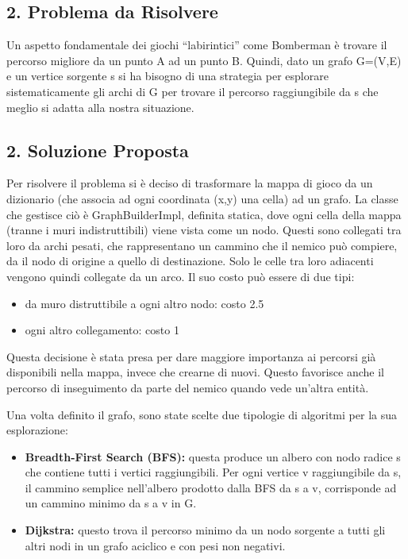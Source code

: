\documentclass[a4paper,12pt]{report}
\begin{document}
\subsection*{2. Problema da Risolvere}
\par
Un aspetto fondamentale dei giochi “labirintici” come Bomberman è trovare il percorso migliore da un punto A ad un punto B. Quindi, dato un grafo G=(V,E) e un vertice sorgente s si ha bisogno di una strategia per esplorare sistematicamente gli archi di G per trovare il percorso raggiungibile da s che meglio si adatta alla nostra situazione. 

\subsection*{2. Soluzione Proposta}
\par
Per risolvere il problema si è deciso di trasformare la mappa di gioco da un dizionario (che associa ad ogni coordinata (x,y) una cella) ad un grafo.
La classe che gestisce ciò è GraphBuilderImpl, definita statica, dove ogni cella della mappa (tranne i muri indistruttibili) viene vista come un nodo. Questi sono collegati tra loro da archi pesati, che rappresentano un cammino che il nemico può compiere, da il nodo di origine a quello di destinazione. Solo le celle tra loro adiacenti vengono quindi collegate da un arco. Il suo costo può essere di due tipi:
\begin{itemize}
    \item da muro distruttibile a ogni altro nodo: costo 2.5
    \item ogni altro collegamento: costo 1
\end{itemize}
Questa decisione è stata presa per dare maggiore importanza ai percorsi già disponibili nella mappa, invece che crearne di nuovi. Questo favorisce anche il percorso di inseguimento da parte del nemico quando vede un'altra entità.

\par
Una volta definito il grafo, sono state scelte due tipologie di algoritmi per la sua esplorazione:
\begin{itemize}
    \item \textbf{Breadth-First Search (BFS):} questa produce un albero con nodo radice s che contiene tutti i vertici raggiungibili. Per ogni vertice v raggiungibile da s, il cammino semplice nell’albero prodotto dalla BFS da s a v, corrisponde ad un cammino minimo da s a v in G.
    \item \textbf{Dijkstra:} questo trova il percorso minimo da un nodo sorgente a tutti gli altri nodi in un grafo aciclico e con pesi non negativi.
\end{itemize}
\end{document}
